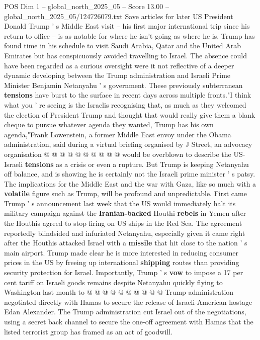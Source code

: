 \begin{textsample}{POS Dim 1 – global\_north\_2025\_05 – Score 13.00 – global\_north\_2025\_05/124726079.txt}  \label{ex:f1_pos_379}
Save articles for later US President Donald Trump ' s Middle East visit -- his first major international trip since his return to office -- is as notable for where he isn't going as where he is.
Trump has found time in his schedule to visit Saudi Arabia, Qatar and the United Arab Emirates but has conspicuously avoided travelling to Israel.
The absence could have been regarded as a curious oversight were it not reflective of a deeper dynamic developing between the Trump administration and Israeli Prime Minister Benjamin Netanyahu ' s government.
These previously subterranean \textbf{tensions} have burst to the surface in recent days across multiple fronts."I think what you ' re seeing is the Israelis recognising that, as much as they welcomed the election of President Trump and thought that would really give them a blank cheque to pursue whatever agenda they wanted, Trump has his own agenda,"Frank Lowenstein, a former Middle East envoy under the Obama administration, said during a virtual briefing organised by J Street, an advocacy organisation @ @ @ @ @ @ @ @ @ @ would be overblown to describe the US-Israeli \textbf{tensions} as a crisis or even a rupture.
But Trump is keeping Netanyahu off balance, and is showing he is certainly not the Israeli prime minister ' s patsy.
The implications for the Middle East and the war with Gaza, like so much with a \textbf{volatile} figure such as Trump, will be profound and unpredictable.
First came Trump ' s announcement last week that the US would immediately halt its military campaign against the \textbf{Iranian-backed} Houthi \textbf{rebels} in Yemen after the Houthis agreed to stop firing on US ships in the Red Sea.
The agreement reportedly blindsided and infuriated Netanyahu, especially given it came right after the Houthis attacked Israel with a \textbf{missile} that hit close to the nation ' s main airport.
Trump made clear he is more interested in reducing consumer prices in the US by freeing up international \textbf{shipping} routes than providing security protection for Israel.
Importantly, Trump ' s \textbf{vow} to impose a 17 per cent tariff on Israeli goods remains despite Netanyahu quickly flying to Washington last month to @ @ @ @ @ @ @ @ @ @ Trump administration negotiated directly with Hamas to secure the release of Israeli-American hostage Edan Alexander.
The Trump administration cut Israel out of the negotiations, using a secret back channel to secure the one-off agreement with Hamas that the listed terrorist group has framed as an act of goodwill.

\end{textsample}
